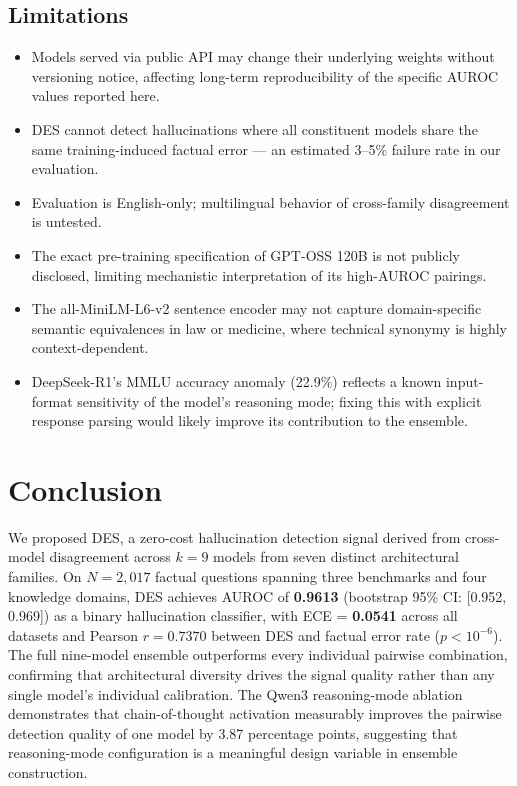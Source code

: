 \documentclass[journal]{IEEEtran}
\begin{document}
\subsection{Limitations}

\begin{itemize}
  \item Models served via public API may change their underlying weights
    without versioning notice, affecting long-term reproducibility of
    the specific AUROC values reported here.
  \item DES cannot detect hallucinations where all constituent models
    share the same training-induced factual error --- an estimated
    3--5\% failure rate in our evaluation.
  \item Evaluation is English-only; multilingual behavior of cross-family
    disagreement is untested.
  \item The exact pre-training specification of GPT-OSS 120B is not
    publicly disclosed, limiting mechanistic interpretation of its
    high-AUROC pairings.
  \item The all-MiniLM-L6-v2 sentence encoder may not capture
    domain-specific semantic equivalences in law or medicine,
    where technical synonymy is highly context-dependent.
  \item DeepSeek-R1's MMLU accuracy anomaly (22.9\%) reflects a
    known input-format sensitivity of the model's reasoning mode;
    fixing this with explicit response parsing would likely improve
    its contribution to the ensemble.
\end{itemize}

\section{Conclusion}
\label{sec:conclusion}

We proposed DES, a zero-cost hallucination detection signal derived from
cross-model disagreement across $k{=}9$ models from seven distinct
architectural families.
On $N{=}2{,}017$ factual questions spanning three benchmarks and four
knowledge domains, DES achieves AUROC of \textbf{0.9613}
(bootstrap 95\% CI: [0.952, 0.969]) as a binary hallucination classifier,
with ECE = \textbf{0.0541} across all datasets and Pearson $r = 0.7370$
between DES and factual error rate ($p < 10^{-6}$).
The full nine-model ensemble outperforms every individual pairwise
combination, confirming that architectural diversity drives the signal
quality rather than any single model's individual calibration.
The Qwen3 reasoning-mode ablation demonstrates that chain-of-thought
activation measurably improves the pairwise detection quality of one
model by 3.87 percentage points, suggesting that reasoning-mode configuration
is a meaningful design variable in ensemble construction.
\end{document}
